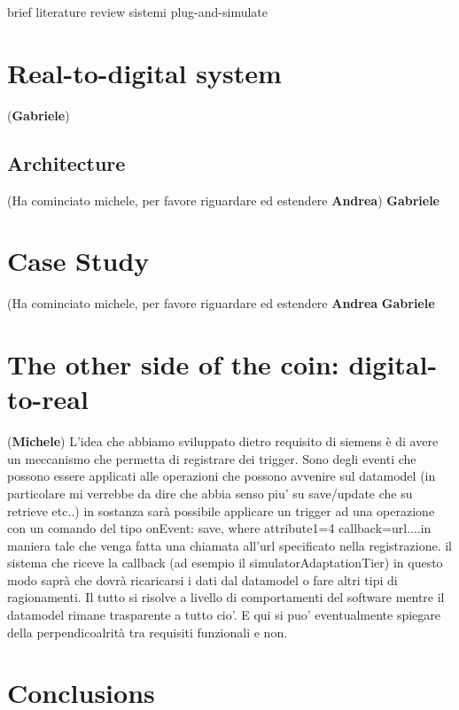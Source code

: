 \documentclass{riverk}
\begin{document}
brief literature review sistemi plug-and-simulate


\section{Real-to-digital system}
(\textbf{Gabriele})


\subsection{Architecture}
(Ha cominciato michele, per favore riguardare ed estendere \textbf{Andrea}) \textbf{Gabriele}




\section{Case Study}
(Ha cominciato michele, per favore riguardare ed estendere \textbf{Andrea} \textbf{Gabriele}


\section{The other side of the coin: digital-to-real}
(\textbf{Michele})
L'idea che abbiamo sviluppato dietro requisito di siemens è di avere un meccanismo che permetta di registrare 
dei trigger. Sono degli eventi che possono essere applicati alle operazioni che possono avvenire sul datamodel (in particolare mi verrebbe da dire che abbia senso piu' su save/update che su retrieve etc..) in sostanza sarà possibile applicare un trigger ad una operazione con un comando del tipo  onEvent: save, where attribute1=4 callback=url....in maniera tale che venga fatta una chiamata all'url specificato nella registrazione. il sistema che riceve la callback (ad esempio il simulatorAdaptationTier) in questo modo saprà che dovrà ricaricarsi i dati dal datamodel o fare altri tipi di ragionamenti. 
Il tutto si risolve a livello di comportamenti del software mentre il datamodel rimane trasparente a tutto cio'. E qui si puo' eventualmente spiegare della perpendicoalrità tra requisiti funzionali e non.



\section{Conclusions}







\end{document}
